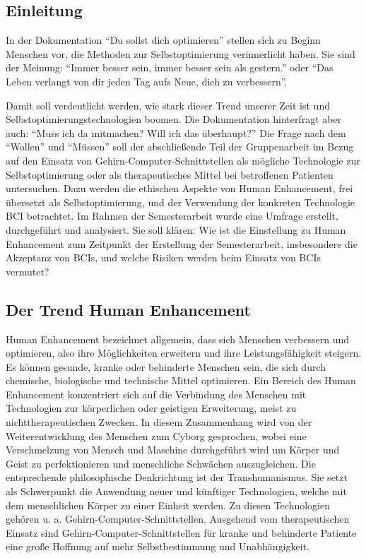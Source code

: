 \documentclass[11pt,ngerman,parskip=half]{scrartcl}
\begin{document}
\subsection{Einleitung}
\label{subsec:kathrin_einleitung}
In der Dokumentation \enquote{Du sollst dich optimieren} stellen sich zu
Beginn Menschen vor, die Methoden zur Selbstoptimierung verinnerlicht haben.
Sie sind der Meinung: \enquote{Immer besser sein, immer besser sein als
gestern.} oder \enquote{Das Leben verlangt von dir jeden Tag aufs Neue, dich
zu verbessern}. \parencite[][Min. 0--1]{dettmer-finke_du_2017}

Damit soll verdeutlicht werden, wie stark dieser Trend unserer Zeit ist und
Selbstoptimierungstechnologien boomen.
\parencite[vgl.][]{defi-filmproduktion_text_2018} Die Dokumentation
hinterfragt aber auch: \enquote{Muss ich da mitmachen? Will ich das
überhaupt?} \parencite[][Min. 1--2]{dettmer-finke_du_2017} Die Frage nach dem
\enquote{Wollen} und \enquote{Müssen} soll der abschließende Teil der
Gruppenarbeit im Bezug auf den Einsatz von Gehirn-Computer-Schnittstellen als
mögliche Technologie zur Selbstoptimierung oder als therapeutisches Mittel
bei betroffenen Patienten untersuchen. Dazu werden die ethischen Aspekte von
Human Enhancement, frei übersetzt als Selbstoptimierung, und der Verwendung
der konkreten Technologie BCI betrachtet. Im Rahmen der Semesterarbeit wurde
eine Umfrage erstellt, durchgeführt und analysiert. Sie soll klären: Wie ist
die Einstellung zu Human Enhancement zum Zeitpunkt der Erstellung der
Semesterarbeit, insbesondere die Akzeptanz von BCIs, und welche Risiken
werden beim Einsatz von BCIs vermutet?

\subsection{Der Trend Human Enhancement}
\label{subsec:kathrin_der_trend_human_enhancement}
Human Enhancement bezeichnet allgemein, dass sich Menschen verbessern und
optimieren, also ihre Möglichkeiten erweitern und ihre Leistungsfähigkeit
steigern. Es können gesunde, kranke oder behinderte Menschen sein, die sich
durch chemische, biologische und technische Mittel optimieren.
\parencite[vgl.][]{bendel_definition:_2018}
Ein Bereich des Human Enhancement konzentriert sich auf die Verbindung des
Menschen mit Technologien zur körperlichen oder geistigen Erweiterung, meist
zu nichttherapeutischen Zwecken. In diesem Zusammenhang wird von der
Weiterentwicklung des Menschen zum Cyborg gesprochen, wobei eine
Verschmelzung von Mensch und Maschine durchgeführt wird um Körper und Geist
zu perfektionieren und menschliche Schwächen auszugleichen.
\parencite[vgl.][75]{bendel_human_2015} Die entsprechende philosophische
Denkrichtung ist der Transhumanismus. Sie setzt als Schwerpunkt die Anwendung
neuer und künftiger Technologien, welche mit dem menschlichen Körper zu einer
Einheit werden. Zu diesen Technologien gehören u. a.
Gehirn-Computer-Schnittstellen.
\parencite[vgl.][]{edlmeier_transhumanismus_2018} Ausgehend vom
therapeutischen Einsatz sind Gehirn-Computer-Schnittstellen für kranke und
behinderte Patiente eine große Hoffnung auf mehr Selbstbestimmung und
Unabhängigkeit.
\end{document}
